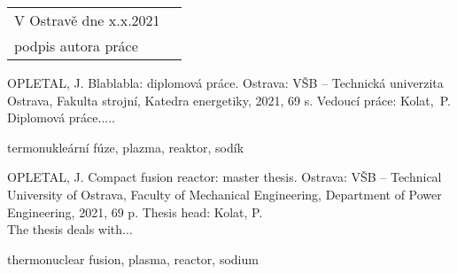 \documentclass[main.tex]{subfiles}
\begin{document}
\vfill

\noindent
\begin{tabularx}{\textwidth}{@{}Xl}
V Ostravě dne x.x.2021 &
\begin{tabular}[t]{c}
  ..................................... \\[-10pt]
  podpis autora práce
\end{tabular} \\
\end{tabularx}

\vspace{3em}

\clearpage


\bigskip\par

\noindent OPLETAL, J. Blablabla: diplomová práce. Ostrava: VŠB – Technická univerzita Ostrava, Fakulta strojní,
Katedra energetiky, 2021, 69 s. Vedoucí práce: Kolat,~P.\\

Diplomová práce.....
\bigskip


\bigskip
{} termonukleární fúze, plazma, reaktor, sodík


\vspace{3em}
\bigskip\par

\noindent OPLETAL, J. Compact fusion reactor:
master thesis. Ostrava: VŠB – Technical University of Ostrava, Faculty of Mechanical
Engineering, Department of Power Engineering, 2021, 69 p. Thesis head: Kolat, P.\\

The thesis deals with...
\bigskip


\bigskip
{} thermonuclear fusion, plasma, reactor, sodium
\end{document}
